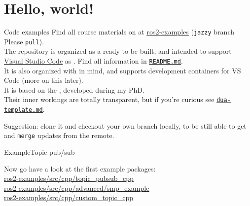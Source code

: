 
\section{Hello, world!}
\graphicspath{{figs/section3/}}

\begin{frame}{Code examples}
	\justifying
	Find all course materials on  at \href{https://github.com/IntelligentSystemsLabUTV/ros2-examples}{\color{blue}\underline{ros2-examples}} (\texttt{jazzy} branch  Please \texttt{pull}).\\
	\bigskip
	The repository is organized as a  ready to be built, and intended to support \href{https://code.visualstudio.com/}{\color{blue}\underline{Visual Studio Code}} as . Find all information in \href{https://github.com/IntelligentSystemsLabUTV/ros2-examples/blob/jazzy/README.md}{\color{blue}\underline{\texttt{README.md}}}.\\
	\bigskip
	It is also organized with  in mind, and supports development containers for VS Code (more on this later).\\
	It is based on the \href{https://github.com/dotX-Automation/dua-template}{}, developed during my PhD.\\
	Their inner workings are totally transparent, but if you're curious see \href{https://github.com/IntelligentSystemsLabUTV/ros2-examples/blob/jazzy/dua-template.md}{\color{blue}\underline{\texttt{dua-template.md}}}.
	\begin{block}{}
		\centering
		Suggestion: clone it and checkout your own branch locally, to be still able to get and \texttt{merge} updates from the remote.
	\end{block}
\end{frame}

\begin{frame}{Example}{Topic pub/sub}
  \justifying
  \begin{block}{}
    \justifying
    \centering
	  Now go have a look at the first example packages:\\
    \href{https://github.com/IntelligentSystemsLabUTV/ros2-examples/tree/jazzy/src/cpp/topic_pubsub_cpp}{\color{blue}\underline{ros2-examples/src/cpp/topic\_pubsub\_cpp}}\\
    \smallskip
    \href{https://github.com/IntelligentSystemsLabUTV/ros2-examples/tree/jazzy/src/cpp/advanced/smp_example}{\color{blue}\underline{ros2-examples/src/cpp/advanced/smp\_example}}\\
    \smallskip
    \href{https://github.com/IntelligentSystemsLabUTV/ros2-examples/tree/jazzy/src/cpp/custom_topic_cpp}{\color{blue}\underline{ros2-examples/src/cpp/custom\_topic\_cpp}}
  \end{block}
\end{frame}

